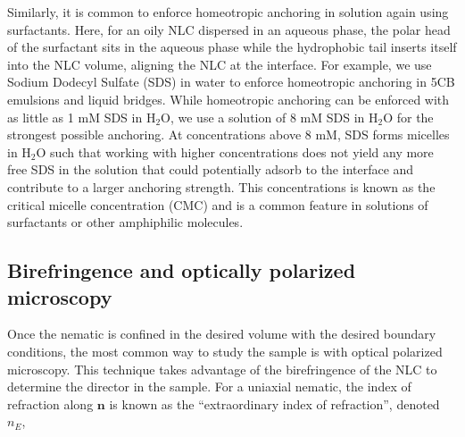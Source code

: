 Similarly, it is common to enforce homeotropic anchoring in solution again using surfactants.
Here, for an oily NLC dispersed in an aqueous phase, the polar head of the surfactant sits in the aqueous phase while the hydrophobic tail inserts itself into the NLC volume, aligning the NLC at the interface.
For example, we use Sodium Dodecyl Sulfate (SDS) in water to enforce homeotropic anchoring in 5CB emulsions and liquid bridges.
While homeotropic anchoring can be enforced with as little as 1 mM SDS in H$_2$O, we use a solution of 8 mM SDS in H$_2$O for the strongest possible anchoring.
At concentrations above 8 mM, SDS forms micelles in H$_2$O such that working with higher concentrations does not yield any more free SDS in the solution that could potentially adsorb to the interface and contribute to a larger anchoring strength.
This concentrations is known as the critical micelle concentration (CMC) and is a common feature in solutions of surfactants or other amphiphilic molecules. \\







\subsection{Birefringence and optically polarized microscopy}
Once the nematic is confined in the desired volume with the desired boundary conditions, the most common way to study the sample is with optical polarized microscopy.
This technique takes advantage of the birefringence of the NLC to determine the director in the sample.
For a uniaxial nematic, the index of refraction along $\mathbf{n}$ is known as the ``extraordinary index of refraction'', denoted $n_E$,
